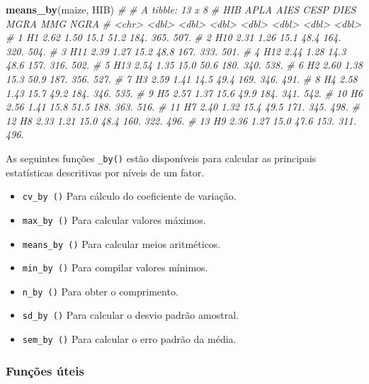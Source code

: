\documentclass[
]{book}
\newenvironment{Shaded}{\begin{snugshade}}{\end{snugshade}}
\newcommand{\CommentTok}[1]{\textcolor[rgb]{0.56,0.35,0.01}{\textit{#1}}}
\newcommand{\KeywordTok}[1]{\textcolor[rgb]{0.13,0.29,0.53}{\textbf{#1}}}
\newcommand{\NormalTok}[1]{#1}
\providecommand{\tightlist}{%
  \setlength{\itemsep}{0pt}\setlength{\parskip}{0pt}}
\begin{document}
\begin{Shaded}
\begin{Highlighting}[]
\KeywordTok{means_by}\NormalTok{(maize, HIB)}
\CommentTok{# # A tibble: 13 x 8}
\CommentTok{#    HIB    APLA  AIES  CESP  DIES  MGRA   MMG  NGRA}
\CommentTok{#    <chr> <dbl> <dbl> <dbl> <dbl> <dbl> <dbl> <dbl>}
\CommentTok{#  1 H1     2.62  1.50  15.1  51.2  184.  365.  507.}
\CommentTok{#  2 H10    2.31  1.26  15.1  48.4  164.  320.  504.}
\CommentTok{#  3 H11    2.39  1.27  15.2  48.8  167.  333.  501.}
\CommentTok{#  4 H12    2.44  1.28  14.3  48.6  157.  316.  502.}
\CommentTok{#  5 H13    2.54  1.35  15.0  50.6  180.  340.  538.}
\CommentTok{#  6 H2     2.60  1.38  15.3  50.9  187.  356.  527.}
\CommentTok{#  7 H3     2.59  1.41  14.5  49.4  169.  346.  491.}
\CommentTok{#  8 H4     2.58  1.43  15.7  49.2  184.  346.  535.}
\CommentTok{#  9 H5     2.57  1.37  15.6  49.9  184.  341.  542.}
\CommentTok{# 10 H6     2.56  1.41  15.8  51.5  188.  363.  516.}
\CommentTok{# 11 H7     2.40  1.32  15.4  49.5  171.  345.  498.}
\CommentTok{# 12 H8     2.33  1.21  15.0  48.4  160.  322.  496.}
\CommentTok{# 13 H9     2.36  1.27  15.0  47.6  153.  311.  496.}
\end{Highlighting}
\end{Shaded}

As seguintes funções \texttt{\_by()} estão disponíveis para calcular as principais estatísticas descritivas por níveis de um fator.

\begin{itemize}
\tightlist
\item
  \texttt{cv\_by\ ()} Para cálculo do coeficiente de variação.
\item
  \texttt{max\_by\ ()} Para calcular valores máximos.
\item
  \texttt{means\_by\ ()} Para calcular meios aritméticos.
\item
  \texttt{min\_by\ ()} Para compilar valores mínimos.
\item
  \texttt{n\_by\ ()} Para obter o comprimento.
\item
  \texttt{sd\_by\ ()} Para calcular o desvio padrão amostral.
\item
  \texttt{sem\_by\ ()} Para calcular o erro padrão da média.
\end{itemize}

\hypertarget{funuxe7uxf5es-uxfateis}{%
\subsubsection{Funções úteis}\label{funuxe7uxf5es-uxfateis}}
\end{document}
